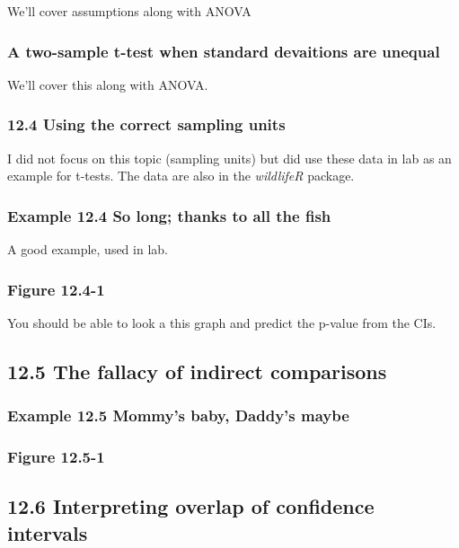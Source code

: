 \documentclass[]{book}
\theoremstyle{definition}
\theoremstyle{definition}
\theoremstyle{definition}
\theoremstyle{remark}
\begin{document}
We'll cover assumptions along with ANOVA

\subsubsection{A two-sample t-test when standard devaitions are
unequal}\label{a-two-sample-t-test-when-standard-devaitions-are-unequal}

We'll cover this along with ANOVA.

\subsubsection{12.4 Using the correct sampling
units}\label{using-the-correct-sampling-units}

I did not focus on this topic (sampling units) but did use these data in
lab as an example for t-tests. The data are also in the \emph{wildlifeR}
package.

\subsubsection{Example 12.4 So long; thanks to all the
fish}\label{example-12.4-so-long-thanks-to-all-the-fish}

A good example, used in lab.

\subsubsection{Figure 12.4-1}\label{figure-12.4-1}

You should be able to look a this graph and predict the p-value from the
CIs.

\subsection{12.5 The fallacy of indirect
comparisons}\label{the-fallacy-of-indirect-comparisons}

\subsubsection{Example 12.5 Mommy's baby, Daddy's
maybe}\label{example-12.5-mommys-baby-daddys-maybe}

\subsubsection{Figure 12.5-1}\label{figure-12.5-1}

\subsection{12.6 Interpreting overlap of confidence
intervals}\label{interpreting-overlap-of-confidence-intervals}
\end{document}
